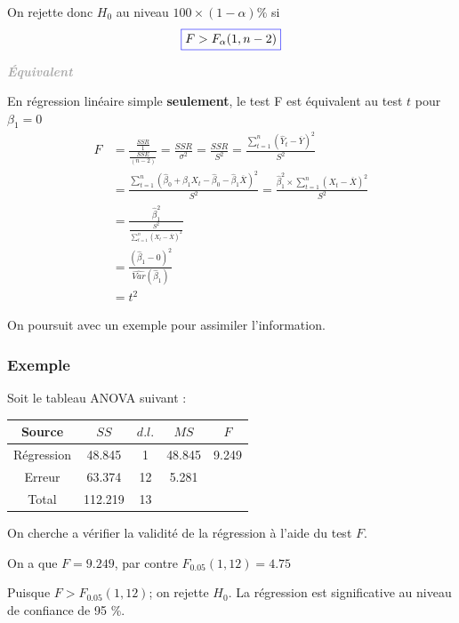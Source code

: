 \documentclass[11pt,french]{report}
\newenvironment{moreInfo}[1]
	{\begin{mdframed}
	\textcolor{darkgray}{\huge \raisebox{-3.5pt}{\faInfo} 
	\hspace{0.5cm} \large\bfseries #1}\\[5pt]
	\normalsize
	\makebox[0.1\textwidth][l]{}	
	\begin{minipage}{10cm}}
	{	\end{minipage}
	\end{mdframed}}
\begin{document}
On rejette donc $H_0$ au niveau $100 \times (1 - \alpha) \%$ si
\begin{equation}
\label{eq:fisher}
\color{blue}
\boxed{\color{black}
F > F_{\alpha}(1, n-2)}
\end{equation}

\begin{moreInfo}{\emph{Équivalent}}
\label{equivalent}
	En régression linéaire simple \textbf{seulement}, le test F est équivalent au test $t$ pour $\beta_1 = 0$
	\begin{align*}
	F &= \frac{\frac{SSR}{1}}{\frac{SSE}{(n-2)}} = \frac{SSR}{\sigma^2} = \frac{SSR}{S^2} = \frac{\displaystyle\sum_{t=1}^n (\hat{Y}_t - \overline{Y})^2}{S^2} \\
	&= \frac{\displaystyle\sum_{t=1}^n(\hat{\beta}_0 + \hat{\beta}_1X_t - \hat{\beta}_0 - \hat{\beta}_1\overline{X})^2}{S^2} = \frac{\hat{\beta}_1^2 \times \displaystyle\sum_{t=1}^n(X_t - \overline{X})^2}{S^2} \\
	&= \frac{\hat{\beta}_1^2}{\frac{S^2}{\displaystyle\sum_{t=1}^n(X_t - \overline{X})^2}} \\
	&= \frac{(\hat{\beta}_1 - 0)^2}{\widehat{Var}(\hat{\beta}_1)} \\
	&= t^2
	\end{align*}
\end{moreInfo}

\bigskip
On poursuit avec un exemple pour assimiler l'information.

\subsubsection*{Exemple}
Soit le tableau ANOVA suivant :
\begin{center}
\begin{tabular}{|c|c|c|c|c|}
\hline
Source & $SS$ & $d.l.$ & $MS$ & $F$ \\
\hline
Régression & 48.845 & 1 & 48.845 & 9.249 \\
Erreur & 63.374 & 12 & 5.281 & \\
\hline
Total & 112.219 & 13 & & \\
\hline
\end{tabular}
\end{center}
On cherche a vérifier la validité de la régression à l'aide du test $F$. \newline

On a que $F = 9.249$, par contre $F_{0.05}(1, 12) = 4.75$ \newline

Puisque $F>F_{0.05}(1, 12)$; on rejette $H_0$. La régression est significative au niveau de confiance de 95 \%. \newline
\end{document}

